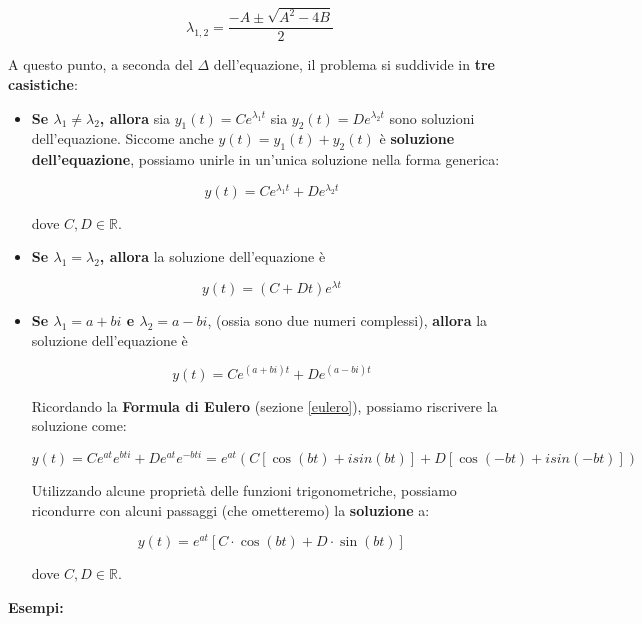 \documentclass[a4paper, 12pt]{report}
\begin{document}
    \[ \lambda_{1, 2} = \frac{-A \pm \sqrt{A^2-4B}}{2}\]
    
    A questo punto, a seconda del $\Delta$ dell'equazione, il problema si suddivide in \textbf{tre casistiche}:
    
    \begin{itemize}
        \item \textbf{Se $\lambda_1 \neq \lambda_2$, allora} sia $y_1(t) = Ce^{\lambda_1 t}$ sia $y_2(t) = De^{\lambda_2 t}$ sono soluzioni dell'equazione. Siccome anche $y(t) = y_1(t) + y_2(t)$ è \textbf{soluzione dell'equazione}, possiamo unirle in un'unica soluzione nella forma generica:
        
        \[ y(t) = Ce^{\lambda_1 t} + De^{\lambda_2 t}\]
        
        dove $C, D \in \mathbb{R}$.
        
        \item \textbf{Se $\lambda_1 = \lambda_2$, allora} la soluzione dell'equazione è
        
        \[ y(t) = (C + Dt) e^{\lambda t}\]
        
        \item \textbf{Se $\lambda_1 = a + bi$ e $\lambda_2 = a - bi$}, (ossia sono due numeri complessi), \textbf{allora} la soluzione dell'equazione è
        
        \[ y(t) = Ce^{(a + bi) t} + De^{(a - bi) t}\]
        
        Ricordando la \textbf{Formula di Eulero} (sezione \ref{eulero}), possiamo riscrivere la soluzione come:
        
        \[ y(t) = Ce^{at} e^{bti} + De^{at} e^{-bti} = e^{at} (C[\cos(bt) + isin(bt)] + D[\cos(-bt)+isin(-bt)])\]
        
        Utilizzando alcune proprietà delle funzioni trigonometriche, possiamo ricondurre con alcuni passaggi (che ometteremo) la \textbf{soluzione} a:
        
        \[ y(t) = e^{at}[C \cdot \cos(bt) + D \cdot \sin(bt)]\]
        
        dove $C, D \in \mathbb{R}$.
        
    \end{itemize}
    
    \quad
    
    \quad
    
    \textbf{Esempi:}
    
\end{document}
